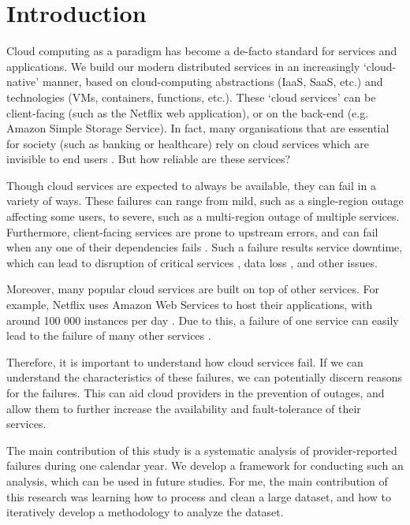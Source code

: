 \section{Introduction}
Cloud computing as a paradigm has become a de-facto standard for services and applications.
We build our modern distributed services in an increasingly `cloud-native' manner, based on cloud-computing abstractions (IaaS, SaaS, etc.) and technologies (VMs, containers, functions, etc.).
These `cloud services' can be client-facing (such as the Netflix web application), or on the back-end (e.g. Amazon Simple Storage Service).
In fact, many organisations that are essential for society (such as banking or healthcare) rely on cloud services which are invisible to end users \cite{armbrust2010,dean2015}.
But how reliable are these services?

Though cloud services are expected to always be available, they can fail in a variety of ways.
These failures can range from mild, such as a single-region outage affecting some users, to severe, such as a multi-region outage of multiple services.
Furthermore, client-facing services are prone to upstream errors, and can fail when any one of their dependencies fails \cite{steen2016}.
Such a failure results service downtime, which can lead to disruption of critical services \cite{emergencyOnCloud,healthcareCrash}, data loss \cite{tencentDataLoss}, and other issues.

Moreover, many popular cloud services are built on top of other services.
For example, Netflix uses Amazon Web Services to host their applications, with around 100 000 instances per day \cite{awsNetflixStudy}.
Due to this, a failure of one service can easily lead to the failure of many other services \cite{whittaker2013,azureXboxOutage2013,azureXboxOutage2014}.

Therefore, it is important to understand how cloud services fail.
If we can understand the characteristics of these failures, we can potentially discern reasons for the failures.
This can aid cloud providers in the prevention of outages, and allow them to further increase the availability and fault-tolerance of their services.

The main contribution of this study is a systematic analysis of provider-reported failures during one calendar year.
We develop a framework for conducting such an analysis, which can be used in future studies.
For me, the main contribution of this research was learning how to process and clean a large dataset, and how to iteratively develop a methodology to analyze the dataset.
